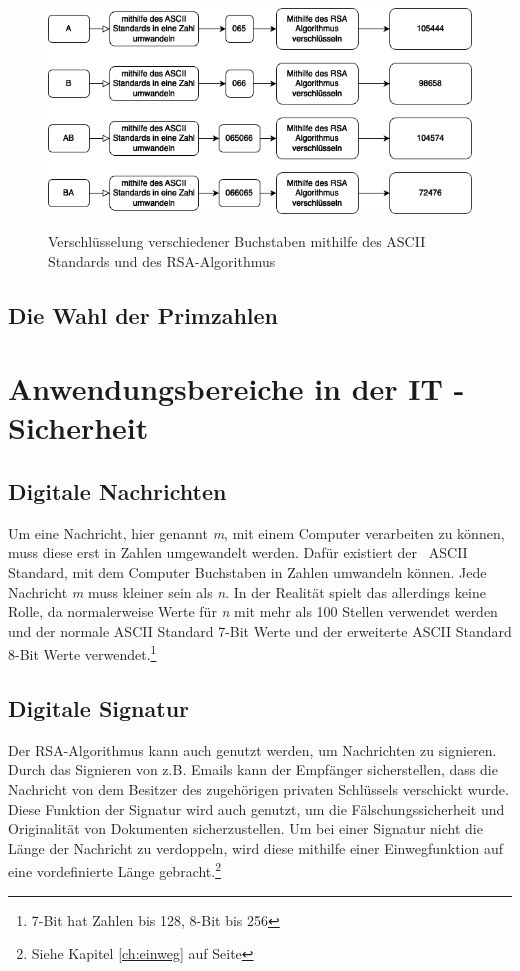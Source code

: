 \documentclass[12pt,a4paper]{scrartcl}
\begin{document}
\begin{figure}		
\includegraphics[scale=0.45]{rsa_mono} \\
\caption{Verschlüsselung verschiedener Buchstaben mithilfe des ASCII Standards und des RSA-Algorithmus}
\label{fig:figure4}
\end{figure}
	
\subsection{Die Wahl der Primzahlen}


\label{chap:primnumberselection}
\pagebreak

\section{Anwendungsbereiche in der IT - Sicherheit}
	\subsection{Digitale Nachrichten}
Um eine Nachricht, hier genannt \textit{m}, mit einem Computer verarbeiten zu können, muss diese erst in Zahlen umgewandelt werden. Dafür existiert der ~ASCII~ Standard, mit dem Computer Buchstaben in Zahlen umwandeln können. Jede Nachricht \textit{m} muss kleiner sein als \textit{n}. In der Realität spielt das allerdings keine Rolle, da normalerweise Werte für \textit{n} mit mehr als 100 Stellen verwendet werden und der normale ASCII Standard 7-Bit Werte und der erweiterte ASCII Standard 8-Bit Werte verwendet.\footnote{7-Bit hat Zahlen bis 128, 8-Bit bis 256}
	
	\subsection{Digitale Signatur}
	Der RSA-Algorithmus kann auch genutzt werden, um Nachrichten zu signieren. Durch das Signieren von z.B. Emails kann der Empfänger sicherstellen, dass die Nachricht von dem Besitzer des zugehörigen privaten Schlüssels verschickt wurde. Diese Funktion der Signatur wird auch genutzt, um die Fälschungssicherheit und Originalität von  Dokumenten sicherzustellen. Um bei einer Signatur nicht die Länge der Nachricht zu verdoppeln, wird diese mithilfe einer Einwegfunktion auf eine vordefinierte Länge gebracht.\footnote{Siehe Kapitel \ref{ch:einweg} auf Seite \pageref{ch:einweg}}\\
\end{document}
